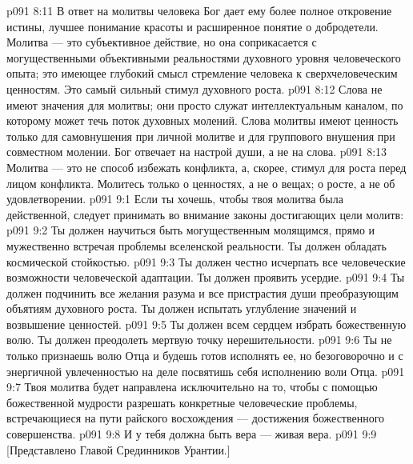 \vs p091 8:11 В ответ на молитвы человека Бог дает ему более полное откровение истины, лучшее понимание красоты и расширенное понятие о добродетели. Молитва --- это субъективное действие, но она соприкасается с могущественными объективными реальностями духовного уровня человеческого опыта; это имеющее глубокий смысл стремление человека к сверхчеловеческим ценностям. Это самый сильный стимул духовного роста.
\vs p091 8:12 Слова не имеют значения для молитвы; они просто служат интеллектуальным каналом, по которому может течь поток духовных молений. Слова молитвы имеют ценность только для самовнушения при личной молитве и для группового внушения при совместном молении. Бог отвечает на настрой души, а не на слова.
\vs p091 8:13 Молитва --- это не способ избежать конфликта, а, скорее, стимул для роста перед лицом конфликта. Молитесь только о ценностях, а не о вещах; о росте, а не об удовлетворении.
\vs p091 9:1 Если ты хочешь, чтобы твоя молитва была действенной, следует принимать во внимание законы достигающих цели молитв:
\vs p091 9:2 \bibnobreakspace Ты должен научиться быть могущественным молящимся, прямо и мужественно встречая проблемы вселенской реальности. Ты должен обладать космической стойкостью.
\vs p091 9:3 \pc {}\bibnobreakspace Ты должен честно исчерпать все человеческие возможности человеческой адаптации. Ты должен проявить усердие.
\vs p091 9:4 \pc {}\bibnobreakspace Ты должен подчинить все желания разума и все пристрастия души преобразующим объятиям духовного роста. Ты должен испытать углубление значений и возвышение ценностей.
\vs p091 9:5 \pc {}\bibnobreakspace Ты должен всем сердцем избрать божественную волю. Ты должен преодолеть мертвую точку нерешительности.
\vs p091 9:6 \pc {}\bibnobreakspace Ты не только признаешь волю Отца и будешь готов исполнять ее, но безоговорочно и с энергичной увлеченностью на деле посвятишь себя исполнению воли Отца.
\vs p091 9:7 \pc {}\bibnobreakspace Твоя молитва будет направлена исключительно на то, чтобы с помощью божественной мудрости разрешать конкретные человеческие проблемы, встречающиеся на пути райского восхождения --- достижения божественного совершенства.
\vs p091 9:8 \pc {}\bibnobreakspace И у тебя должна быть вера --- живая вера.
\vsetoff
\vs p091 9:9 [Представлено Главой Срединников Урантии.]
